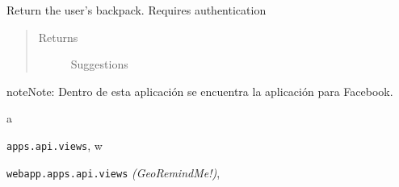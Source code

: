 \documentclass[letterpaper,10pt,english]{sphinxmanual}
\begin{document}
\begin{fulllineitems}
\label{api:apps.api.views.api_user_backpack}
Return the user's backpack. Requires authentication
\begin{quote}\begin{description}
\item[{Returns}] \leavevmode
Suggestions

\end{description}\end{quote}

\end{fulllineitems}


\begin{notice}{note}{Note:}
Dentro de esta aplicación se encuentra la aplicación para Facebook.
\end{notice}


\renewcommand{\indexname}{Python Module Index}
\begin{theindex}
\def\bigletter#1{{\Large\sffamily#1}\nopagebreak\vspace{1mm}}
\bigletter{a}
\item {\texttt{apps.api.views}}, \pageref{api:module-apps.api.views}
\indexspace
\bigletter{w}
\item {\texttt{webapp.apps.api.views}} \emph{(GeoRemindMe!)}, \pageref{api:module-webapp.apps.api.views}
\end{theindex}

\renewcommand{\indexname}{Index}
\printindex
\end{document}
